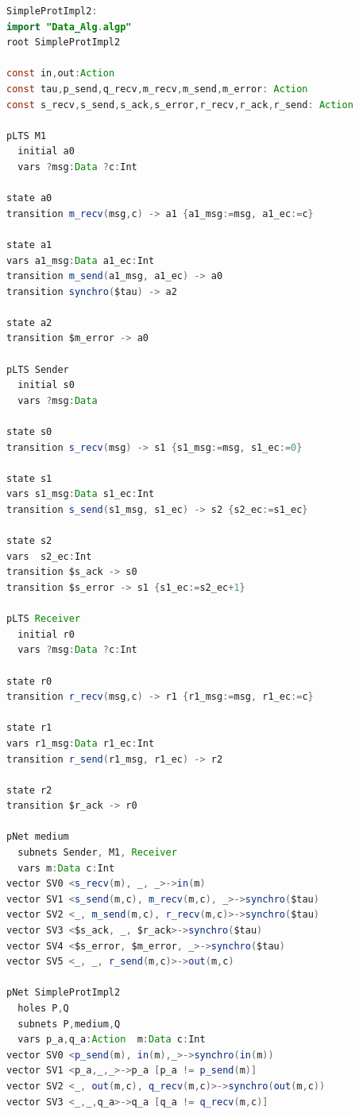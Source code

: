 \documentclass{lmcs}
\begin{document}
\begin{lstlisting}[basicstyle=\scriptsize\ttfamily, language=java, frame=single]
SimpleProtImpl2:
import "Data_Alg.algp"
root SimpleProtImpl2

const in,out:Action
const tau,p_send,q_recv,m_recv,m_send,m_error: Action
const s_recv,s_send,s_ack,s_error,r_recv,r_ack,r_send: Action

pLTS M1
  initial a0
  vars ?msg:Data ?c:Int

state a0
transition m_recv(msg,c) -> a1 {a1_msg:=msg, a1_ec:=c}

state a1
vars a1_msg:Data a1_ec:Int
transition m_send(a1_msg, a1_ec) -> a0 
transition synchro($tau) -> a2

state a2
transition $m_error -> a0

pLTS Sender
  initial s0
  vars ?msg:Data

state s0
transition s_recv(msg) -> s1 {s1_msg:=msg, s1_ec:=0}

state s1
vars s1_msg:Data s1_ec:Int
transition s_send(s1_msg, s1_ec) -> s2 {s2_ec:=s1_ec}

state s2
vars  s2_ec:Int
transition $s_ack -> s0
transition $s_error -> s1 {s1_ec:=s2_ec+1}

pLTS Receiver
  initial r0
  vars ?msg:Data ?c:Int

state r0
transition r_recv(msg,c) -> r1 {r1_msg:=msg, r1_ec:=c}

state r1
vars r1_msg:Data r1_ec:Int
transition r_send(r1_msg, r1_ec) -> r2

state r2
transition $r_ack -> r0

pNet medium
  subnets Sender, M1, Receiver
  vars m:Data c:Int
vector SV0 <s_recv(m), _, _>->in(m)
vector SV1 <s_send(m,c), m_recv(m,c), _>->synchro($tau)
vector SV2 <_, m_send(m,c), r_recv(m,c)>->synchro($tau)
vector SV3 <$s_ack, _, $r_ack>->synchro($tau)
vector SV4 <$s_error, $m_error, _>->synchro($tau)
vector SV5 <_, _, r_send(m,c)>->out(m,c)

pNet SimpleProtImpl2
  holes P,Q
  subnets P,medium,Q
  vars p_a,q_a:Action  m:Data c:Int
vector SV0 <p_send(m), in(m),_>->synchro(in(m))
vector SV1 <p_a,_,_>->p_a [p_a != p_send(m)]
vector SV2 <_, out(m,c), q_recv(m,c)>->synchro(out(m,c))
vector SV3 <_,_,q_a>->q_a [q_a != q_recv(m,c)]
\end{lstlisting}

\end{document}
